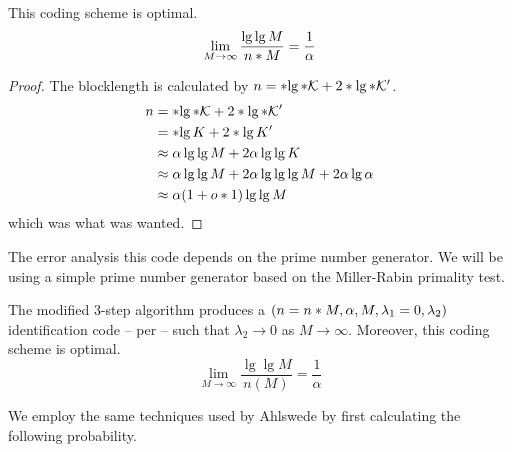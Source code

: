 \begin{theorem}
	This coding scheme is optimal.
	\begin{equation}
		\lim_{M \to \infty} \dfrac{\lg \lg M}{\func{n}{M}} = \dfrac{1}{\alpha}
	\end{equation}
\end{theorem}

\begin{proof}
	The blocklength is calculated by \(n = \ceil{\lg \abs{\mathcal{K}}} + 2\ceil{\lg \abs{\mathcal{K}'}}\).
	\begin{align}
		n &= \ceil{\lg \abs{\mathcal{K}}} + 2\ceil{\lg \abs{\mathcal{K}'}}\\
		&= \ceil{\lg K} + 2\ceil{\lg K'} \\
		&\approx \alpha\lg\lg M +  2 \alpha \lg \lg K \\
		&\approx \alpha\lg \lg M + 2\alpha \lg \lg \lg M + 2 \alpha \lg \alpha \\
		&\approx \alpha(1 + \littleO{1}) \lg\lg M
	\end{align}
	which was what was wanted.
\end{proof}
The error analysis this code depends on the prime number generator. We will be using a simple prime number generator based on the Miller-Rabin primality test.
\begin{theorem}\label{thm:modified3step}
	The modified 3-step algorithm produces a \((n = \func{n}{M,\alpha}, M, \lambda_1 = 0, \lambda_2)\) identification code -- per -- such that \(\lambda_2 \to 0\) as \(M \to \infty\). Moreover, this coding scheme is optimal.
	\begin{equation}
		\lim_{M \to \infty} \dfrac{\lg \lg M}{n(M)} = \frac{1}{\alpha}
	\end{equation}
\end{theorem}
We employ the same techniques used by Ahlswede by first calculating the following probability.

